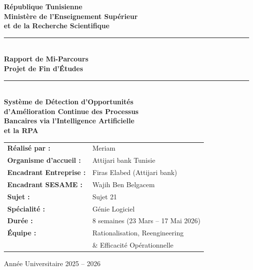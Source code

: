 \documentclass[12pt,a4paper]{report}
\begin{document}
\begin{titlepage}
    \centering
    \vspace*{1cm}
    
    {\large\textbf{République Tunisienne}}\\
    {\large\textbf{Ministère de l'Enseignement Supérieur}}\\[0.3cm]
    {\large\textbf{et de la Recherche Scientifique}}\\[1.5cm]
    
    \rule{\textwidth}{1.5pt}\\[0.4cm]
    {\Huge\bfseries\textcolor{attijariDark}{Rapport de Mi-Parcours}}\\[0.2cm]
    {\Large\bfseries\textcolor{attijariDark}{Projet de Fin d'Études}}\\[0.3cm]
    \rule{\textwidth}{1.5pt}\\[1cm]
    
    {\LARGE\bfseries\textcolor{attijariOrange}{Système de Détection d'Opportunités}}\\[0.2cm]
    {\LARGE\bfseries\textcolor{attijariOrange}{d'Amélioration Continue des Processus}}\\[0.2cm]
    {\LARGE\bfseries\textcolor{attijariOrange}{Bancaires via l'Intelligence Artificielle}}\\[0.2cm]
    {\LARGE\bfseries\textcolor{attijariOrange}{et la RPA}}\\[1.5cm]
    
    \begin{tabular}{ll}
        \textbf{Réalisé par :} & Meriam \\[0.2cm]
        \textbf{Organisme d'accueil :} & Attijari bank Tunisie \\[0.2cm]
        \textbf{Encadrant Entreprise :} & Firas Elabed (Attijari bank) \\[0.2cm]
        \textbf{Encadrant SESAME :} & Wajih Ben Belgacem \\[0.2cm]
        \textbf{Sujet :} & Sujet 21 \\[0.2cm]
        \textbf{Spécialité :} & Génie Logiciel \\[0.2cm]
        \textbf{Durée :} & 8 semaines (23 Mars -- 17 Mai 2026) \\[0.2cm]
        \textbf{Équipe :} & Rationalisation, Reengineering \\
        & \& Efficacité Opérationnelle \\
    \end{tabular}
    
    \vfill
    
    {\large\textcolor{attijariGray}{Année Universitaire 2025 -- 2026}}
    
\end{titlepage}
\end{document}
